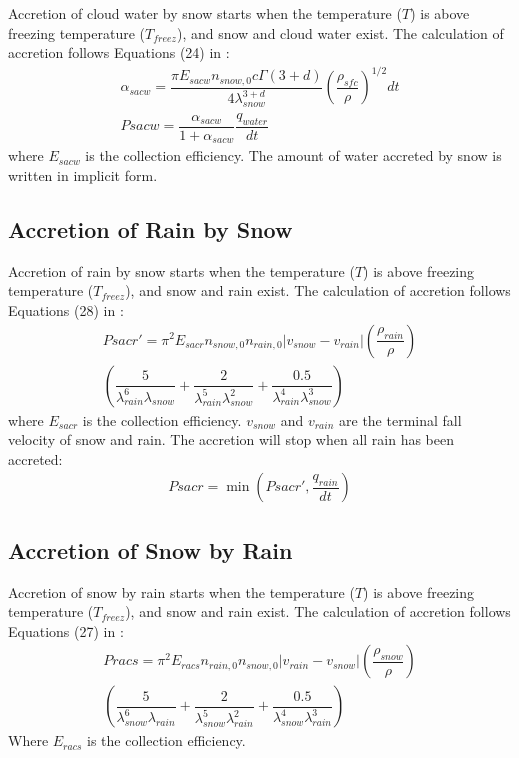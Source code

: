 \documentclass[letterpaper,titlepage,10pt]{article}
\numberwithin{equation}{section}
\begin{document}
Accretion of cloud water by snow starts when the temperature ($T$) is above freezing temperature ($T_{freez}$), and snow and cloud water exist. The calculation of accretion follows Equations (24) in \citet{lin1983bulk}:
\begin{gather}
	\alpha_{sacw} = \dfrac{\pi E_{sacw} n_{snow,0} c \Gamma\left(3 + d \right)}{4 \lambda^{3 + d}_{snow}} \left(\dfrac{\rho_{sfc}}{\rho} \right)^{1/2} dt \\
	Psacw = \dfrac{\alpha_{sacw}}{1 + \alpha_{sacw}} \dfrac{q_{water}}{dt}
\end{gather}
where $E_{sacw}$ is the collection efficiency. The amount of water accreted by snow is written in implicit form.


\subsection{Accretion of Rain by Snow}

Accretion of rain by snow starts when the temperature ($T$) is above freezing temperature ($T_{freez}$), and snow and rain exist. The calculation of accretion follows Equations (28) in \citet{lin1983bulk}:
\begin{multline}
	Psacr' = \pi^2 E_{sacr} n_{snow,0} n_{rain,0} \left \vert v_{snow} - v_{rain} \right \vert \left(\dfrac{\rho_{rain}}{\rho} \right) \\
	\left(\dfrac{5}{\lambda^6_{rain} \lambda_{snow}} + \dfrac{2}{\lambda^5_{rain} \lambda^2_{snow}} + \dfrac{0.5}{\lambda^4_{rain} \lambda^3_{snow}} \right)
\end{multline}
where $E_{sacr}$ is the collection efficiency. $v_{snow}$ and $v_{rain}$ are the terminal fall velocity of snow and rain. The accretion will stop when all rain has been accreted:
\begin{gather}
	Psacr = \min \left(Psacr', \dfrac{q_{rain}}{dt} \right)
\end{gather}


\subsection{Accretion of Snow by Rain}

Accretion of snow by rain starts when the temperature ($T$) is above freezing temperature ($T_{freez}$), and snow and rain exist. The calculation of accretion follows Equations (27) in \citet{lin1983bulk}:
\begin{multline}
	Pracs = \pi^2 E_{racs} n_{rain,0} n_{snow,0} \left \vert v_{rain} - v_{snow} \right \vert \left(\dfrac{\rho_{snow}}{\rho} \right) \\
	\left(\dfrac{5}{\lambda^6_{snow} \lambda_{rain}} + \dfrac{2}{\lambda^5_{snow} \lambda^2_{rain}} + \dfrac{0.5}{\lambda^4_{snow} \lambda^3_{rain}} \right)
\end{multline}
Where $E_{racs}$ is the collection efficiency. 
\end{document}
